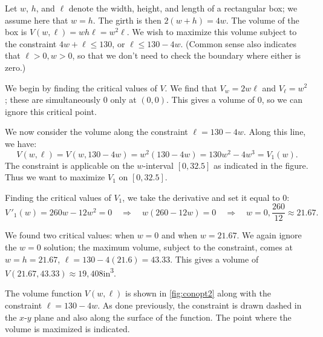 {Let $w$, $h$, and $\ell$ denote the width, height, and length of a rectangular box; we assume here that $w=h$. The girth is then $2(w+h) = 4w$. The volume of the box is $V(w,\ell) = wh\ell = w^2\ell$. We wish to maximize this volume subject to the constraint $4w+\ell\leq 130$, or $\ell\leq 130-4w$. (Common sense also indicates that $\ell>0, w>0$, so that we don't need to check the boundary where either is zero.)

We begin by finding the critical values of $V$. We find that $V_w = 2w\ell$ and $V_\ell = w^2$; these are simultaneously 0 only at $(0,0)$. This gives a volume of 0, so we can ignore this critical point. 

We now consider the volume along the constraint $\ell=130-4w.$ Along this line, we have:
$$V(w,\ell) = V(w,130-4w) = w^2(130-4w) = 130w^2-4w^3 = V_1(w).$$
The constraint is applicable on the $w$-interval $[0,32.5]$ as indicated in the figure. Thus we want to maximize $V_1$ on $[0,32.5]$. 

Finding the critical values of $V_1$, we take the derivative and set it equal to 0:
$$V\,'_1(w) = 260w-12w^2 = 0 \quad \Rightarrow \quad w(260-12w)= 0 \quad \Rightarrow \quad w=0,\frac{260}{12}\approx 21.67.$$

We found two critical values: when $w=0$ and when $w=21.67$. We again ignore the $w=0$ solution; the maximum volume, subject to the constraint, comes at $w=h=21.67$, $\ell = 130-4(21.6) =43.33.$ This gives a volume of $V(21.67,43.33) \approx 19{,}408$in\textsuperscript3. 


The volume function $V(w,\ell)$ is shown in \autoref{fig:conopt2} along with the constraint $\ell = 130-4w$. As done previously, the constraint is drawn dashed in the $x$-$y$ plane and also along the surface of the function. The point where the volume is maximized is indicated.}

